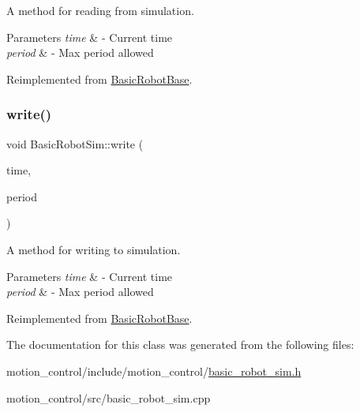 A method for reading from simulation. 


\begin{DoxyParams}{Parameters}
{\em time} & -\/ Current time \\
\hline
{\em period} & -\/ Max period allowed \\
\hline
\end{DoxyParams}


Reimplemented from \hyperlink{classBasicRobotBase_a64bb2c7bed72e98fb62a37d6beb4fe5a}{Basic\+Robot\+Base}.

\mbox{\label{classBasicRobotSim_a0efb3d3e006cd5c233e2e273d89e06f6}} 
\subsubsection{\texorpdfstring{write()}{write()}}
{\footnotesize\ttfamily void Basic\+Robot\+Sim\+::write (\begin{DoxyParamCaption}\item[{const ros\+::\+Time \&}]{time,  }\item[{const ros\+::\+Duration \&}]{period }\end{DoxyParamCaption})\hspace{0.3cm}{\ttfamily [virtual]}}



A method for writing to simulation. 


\begin{DoxyParams}{Parameters}
{\em time} & -\/ Current time \\
\hline
{\em period} & -\/ Max period allowed \\
\hline
\end{DoxyParams}


Reimplemented from \hyperlink{classBasicRobotBase_afbc6ef4347fc05e053391692a9e1bc24}{Basic\+Robot\+Base}.



The documentation for this class was generated from the following files\+:\begin{DoxyCompactItemize}
\item 
motion\+\_\+control/include/motion\+\_\+control/\hyperlink{basic__robot__sim_8h}{basic\+\_\+robot\+\_\+sim.\+h}\item 
motion\+\_\+control/src/basic\+\_\+robot\+\_\+sim.\+cpp\end{DoxyCompactItemize}
